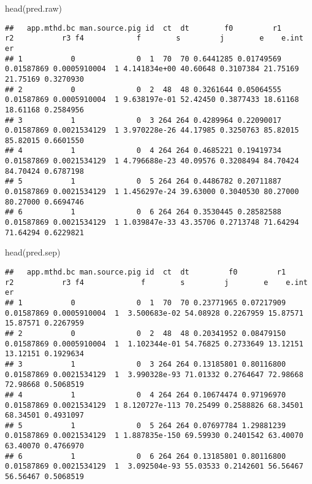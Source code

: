 \documentclass[
  landscape]{article}
\newenvironment{Shaded}{\begin{snugshade}}{\end{snugshade}}
\newcommand{\FunctionTok}[1]{\textcolor[rgb]{0.00,0.00,0.00}{#1}}
\newcommand{\NormalTok}[1]{#1}
\begin{document}
\begin{Shaded}
\begin{Highlighting}[]
\FunctionTok{head}\NormalTok{(pred.raw)}
\end{Highlighting}
\end{Shaded}

\begin{verbatim}
##   app.mthd.bc man.source.pig id  ct  dt        f0         r1         r2           r3 f4            f        s         j        e    e.int        er
## 1           0              0  1  70  70 0.6441285 0.01749569 0.01587869 0.0005910004  1 4.141834e+00 40.60648 0.3107384 21.75169 21.75169 0.3270930
## 2           0              0  2  48  48 0.3261644 0.05064555 0.01587869 0.0005910004  1 9.638197e-01 52.42450 0.3877433 18.61168 18.61168 0.2584956
## 3           1              0  3 264 264 0.4289964 0.22090017 0.01587869 0.0021534129  1 3.970228e-26 44.17985 0.3250763 85.82015 85.82015 0.6601550
## 4           1              0  4 264 264 0.4685221 0.19419734 0.01587869 0.0021534129  1 4.796688e-23 40.09576 0.3208494 84.70424 84.70424 0.6787198
## 5           1              0  5 264 264 0.4486782 0.20711887 0.01587869 0.0021534129  1 1.456297e-24 39.63000 0.3040530 80.27000 80.27000 0.6694746
## 6           1              0  6 264 264 0.3530445 0.28582588 0.01587869 0.0021534129  1 1.039847e-33 43.35706 0.2713748 71.64294 71.64294 0.6229821
\end{verbatim}

\begin{Shaded}
\begin{Highlighting}[]
\FunctionTok{head}\NormalTok{(pred.sep)}
\end{Highlighting}
\end{Shaded}

\begin{verbatim}
##   app.mthd.bc man.source.pig id  ct  dt         f0         r1         r2           r3 f4             f        s         j        e    e.int        er
## 1           0              0  1  70  70 0.23771965 0.07217909 0.01587869 0.0005910004  1  3.500683e-02 54.08928 0.2267959 15.87571 15.87571 0.2267959
## 2           0              0  2  48  48 0.20341952 0.08479150 0.01587869 0.0005910004  1  1.102344e-01 54.76825 0.2733649 13.12151 13.12151 0.1929634
## 3           1              0  3 264 264 0.13185801 0.80116800 0.01587869 0.0021534129  1  3.990328e-93 71.01332 0.2764647 72.98668 72.98668 0.5068519
## 4           1              0  4 264 264 0.10674474 0.97196970 0.01587869 0.0021534129  1 8.120727e-113 70.25499 0.2588826 68.34501 68.34501 0.4931097
## 5           1              0  5 264 264 0.07697784 1.29881239 0.01587869 0.0021534129  1 1.887835e-150 69.59930 0.2401542 63.40070 63.40070 0.4766970
## 6           1              0  6 264 264 0.13185801 0.80116800 0.01587869 0.0021534129  1  3.092504e-93 55.03533 0.2142601 56.56467 56.56467 0.5068519
\end{verbatim}
\end{document}
